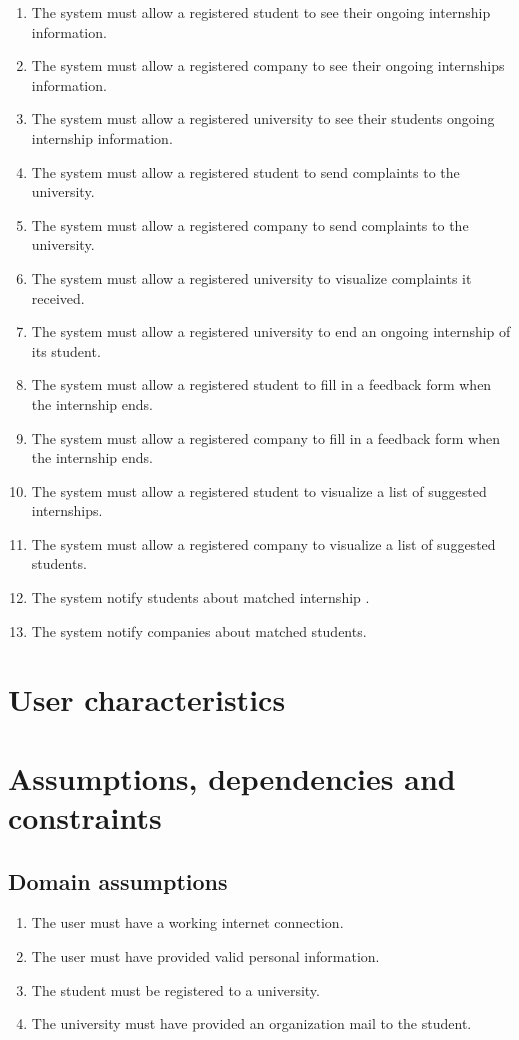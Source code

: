 \begin{enumerate}[label=\textbf{R\arabic* -}]
    \item The system must allow a registered student to see their ongoing internship information.
    \item The system must allow a registered company to see their ongoing internships information.
    \item The system must allow a registered university to see their students ongoing internship information.
    \item The system must allow a registered student to send complaints to the university.
    \item The system must allow a registered company to send complaints to the university.
    \item The system must allow a registered university to visualize complaints it received.
    \item The system must allow a registered university to end an ongoing internship of its student.
    \item The system must allow a registered student to fill in a feedback form when the internship ends.
    \item The system must allow a registered company to fill in a feedback form when the internship ends.
    \item The system must allow a registered student to visualize a list of suggested internships.
    \item The system must allow a registered company to visualize a list of suggested students.
    \item The system notify students about matched internship .
    \item The system notify companies about matched students.
\end{enumerate}

\section{User characteristics}

\section{Assumptions, dependencies and constraints}

\subsection{Domain assumptions}

\begin{enumerate}[label=\textbf{D\arabic* -}]
    \item The user must have a working internet connection.
    \item The user must have provided valid personal information.
    \item The student must be registered to a university.
    \item The university must have provided an organization mail to the student.
\end{enumerate}
